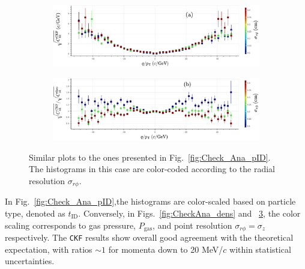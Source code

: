 \begin{figure}[!ht]
     \centering
     \begin{subfigure}[b]{0.99\textwidth}
         \centering
         \includegraphics[width=\textwidth]{figures/ch5-KF_NDGAr/ToySample/ParScan/TotVSExpVSres_noNorm_label.eps}
         \caption{}
         \label{fig:CheckAna_res_noNorm}
     \end{subfigure}
     \begin{subfigure}[b]{0.99\textwidth}
         \centering
         \includegraphics[width=\textwidth]{figures/ch5-KF_NDGAr/ToySample/ParScan/TotVSExpVSres_label.eps}
         \caption{}
         \label{fig:CheckAna_res_Norm}
     \end{subfigure}
        \caption[Similar plots to the ones presented in Fig.~\ref{fig:Check_Ana_pID}. The histograms in this case are color-coded according to the radial resolution $\sigma_{r\phi}$.]{Similar plots to the ones presented in Fig.~\ref{fig:Check_Ana_pID}. The histograms in this case are color-coded according to the radial resolution $\sigma_{r\phi}$.}
        \label{fig:Check_Ana_res}
\end{figure} 

In Fig.~\ref{fig:Check_Ana_pID},the histograms are color-scaled based on particle type, denoted as $t_\textrm{ID}$. Conversely, in Figs.~\ref{fig:CheckAna_dens} and ~\ref{fig:Check_Ana_res}, the color scaling corresponds to gas pressure, $P_{\textrm{gas}}$, and point resolution $\sigma_{r\phi}=\sigma_z$ respectively. The \texttt{CKF} results show overall good agreement with the theoretical expectation, with ratios $\sim 1$ for momenta down to 20 MeV/$c$ within statistical uncertainties.

